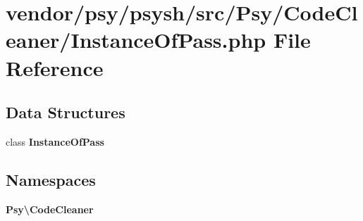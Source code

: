 \section{vendor/psy/psysh/src/\+Psy/\+Code\+Cleaner/\+Instance\+Of\+Pass.php File Reference}
\label{_instance_of_pass_8php}
\subsection*{Data Structures}
\begin{DoxyCompactItemize}
\item 
class {\bf Instance\+Of\+Pass}
\end{DoxyCompactItemize}
\subsection*{Namespaces}
\begin{DoxyCompactItemize}
\item 
 {\bf Psy\textbackslash{}\+Code\+Cleaner}
\end{DoxyCompactItemize}
